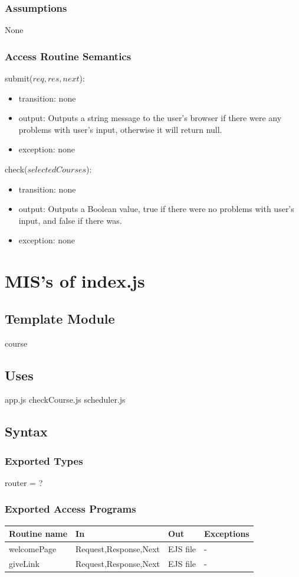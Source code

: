 \documentclass[11pt, oneside]{article}
\begin{document}
\subsubsection* {Assumptions}
None
\subsubsection* {Access Routine Semantics}
submit($req, res, next$):
\begin{itemize}
\item transition: none
\item output: Outputs a string message to the user's browser if there were any problems with user's input, otherwise it will return null. 
\item exception:
 none
\end{itemize}
\noIndent
check($selectedCourses$):
\begin{itemize}
\item transition: none
\item output: Outputs a Boolean value, true if there were no problems with user's input, and false if there was. 
\item exception:
 none
\end{itemize}


\newpage

\section{MIS's of index.js}
\subsection*{Template Module}
course
\subsection* {Uses}
app.js
checkCourse.js
scheduler.js
\subsection* {Syntax}
\subsubsection* {Exported Types}
router = ?
\subsubsection* {Exported Access Programs}
\begin{tabular}{| l | l | l | l |}
\hline
\textbf{Routine name} & \textbf{In} & \textbf{Out} & \textbf{Exceptions}\\
\hline
welcomePage & Request,Response,Next & EJS file & -\\
\hline
giveLink &  Request,Response,Next & EJS file & -\\
\hline

\end{tabular}
\end{document}
